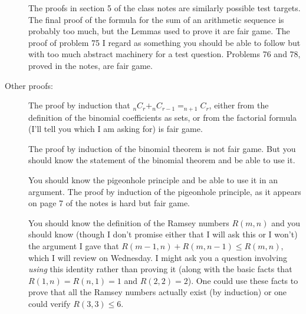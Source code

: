 \documentclass[12pt]{article}
\begin{document}
\begin{description}
The proofs in section 5 of the class notes are similarly possible test targets.  The final proof of the formula for the sum of an arithmetic sequence is probably too much, but the Lemmas used to prove it are fair game.  The proof of problem 75 I regard as something you should be able to follow but with too much abstract machinery for a test question.  Problems 76 and 78, proved in the notes, are fair game.

\item[Other proofs:]  The proof by induction that $_nC_r+_nC_{r-1} = _{n+1}C_r$, either from the definition of the binomial coefficients as sets, or from the factorial formula (I'll tell you which I am asking for) is fair game.

The proof by induction of the binomial theorem is not fair game.  But you should know the statement of the binomial theorem and be able to use it.

You should know the pigeonhole principle and be able to use it in an argument.  The proof by induction of the pigeonhole principle, as it appears on page 7 of the notes is hard but fair game.

You should know the definition of the Ramsey numbers $R(m,n)$ and you should know (though I don't promise either that I will ask this or I won't) the argument I gave that $R(m-1,n)+R(m,n-1)\leq R(m,n)$, which I will review on Wednesday.   I might ask you a question involving {\em using\/} this identity rather than proving it (along with the basic facts
that $R(1,n) = R(n,1) = 1$ and $R(2,2)=2$).  One could use these facts to prove that all the Ramsey numbers actually exist (by induction) or one could verify $R(3,3) \leq 6$.

\end{description}
\end{document}
